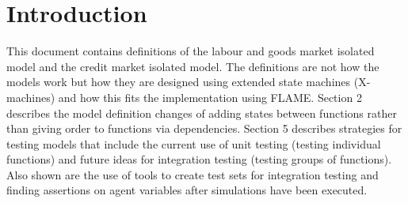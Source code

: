 \section{Introduction}

This document contains definitions of the labour and goods market isolated
model and the credit market isolated model. The definitions are not how the
models work but how they are designed using extended state machines (X-machines)
and how this fits the implementation using FLAME. Section 2 describes the model
definition changes of adding states between functions rather than giving order
to functions via dependencies. Section 5 describes strategies for testing
models that include the current use of unit testing (testing individual
functions) and future ideas for integration testing (testing groups of
functions). Also shown are the use of tools to create test sets for integration
testing and finding assertions on agent variables after simulations have been
executed.
